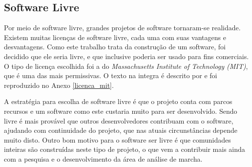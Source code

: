 \subsection{Software Livre}
\label{mit_sec}

Por meio de software livre, grandes projetos de software tornaram-se realidade. 
Existem muitas licenças de software livre, cada uma com suas vantagens e desvantagens. 
Como este trabalho trata da construção de um software, foi decidido que ele seria livre, e que inclusive poderia ser usado para fins comerciais. 
O tipo de licença escolhida foi a do \emph{Massachusetts Institute of Technology (MIT)}, que é uma das mais permissivas. 
O texto na integra é descrito por  e foi reproduzido no Anexo \ref{licenca_mit}.

A estratégia para escolha de software livre é que o projeto conta com parcos recursos e um software como este custaria muito para ser desenvolvido. 
Sendo livre é mais provável que outros desenvolvedores contribuam com o software, ajudando com continuidade do projeto, que nas atuais circunstâncias depende muito disto.
Outro bom motivo para o software ser livre é que comunidades inteiras são construídas neste tipo de projeto, o que vem a contribuir mais ainda com a pesquisa e o desenvolvimento da área de análise de marcha.

